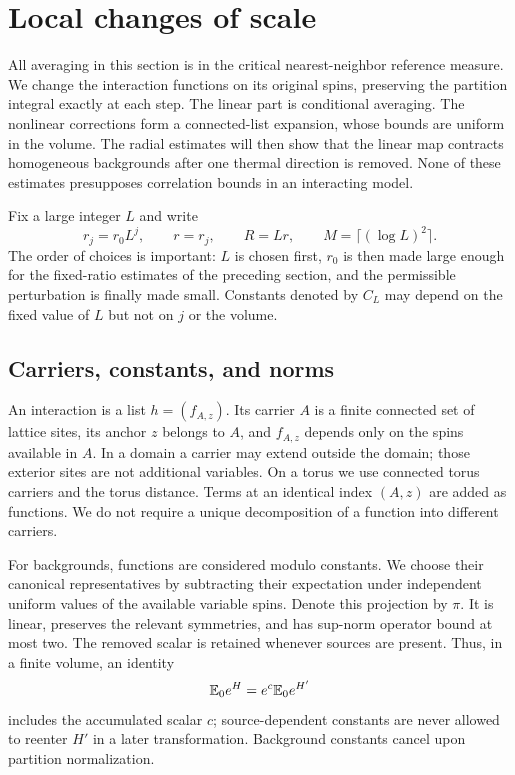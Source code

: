 \section{Local changes of scale}
\label{sec:renormalization}

All averaging in this section is in the critical nearest-neighbor reference
measure.  We change the interaction functions on its original spins,
preserving the partition integral exactly at each step.  The linear part
is conditional averaging.  The nonlinear corrections form a connected-list
expansion, whose bounds are uniform in the volume.  The
radial estimates will then show that the linear map contracts homogeneous
backgrounds after one thermal direction is removed.  None of these
estimates presupposes correlation bounds in an interacting model.

Fix a large integer $L$ and write
\[
 r_j=r_0L^j,\qquad r=r_j,\qquad R=Lr,\qquad
 M=\lceil(\log L)^2\rceil.
\]
The order of choices is important: $L$ is chosen first, $r_0$ is then made
large enough for the fixed-ratio estimates of the preceding section, and
the permissible perturbation is finally made small.  Constants denoted by
$C_L$ may depend on the fixed value of $L$ but not on $j$ or the volume.

\subsection{Carriers, constants, and norms}

An interaction is a list $h=(f_{A,z})$.  Its carrier $A$ is a finite connected
set of lattice sites, its anchor $z$ belongs to $A$, and $f_{A,z}$ depends
only on the spins available in $A$.  In a domain a carrier may extend
outside the domain; those exterior sites are not additional variables.
On a torus we use connected torus carriers and the torus distance.  Terms
at an identical index $(A,z)$ are added as functions.  We do not require a
unique decomposition of a function into different carriers.

For backgrounds, functions are considered modulo constants.  We choose
their canonical representatives by subtracting their expectation under
independent uniform values of the available variable spins.  Denote this
projection by $\pi$.  It is linear, preserves the relevant symmetries, and
has sup-norm operator bound at most two.  The removed scalar is retained
whenever sources are present.  Thus, in a finite volume, an identity
\[
 \mathbb E_0 e^{H}=e^c\mathbb E_0 e^{H'}
\]
includes the accumulated scalar $c$; source-dependent constants are never
allowed to reenter $H'$ in a later transformation.  Background constants
cancel upon partition normalization.

